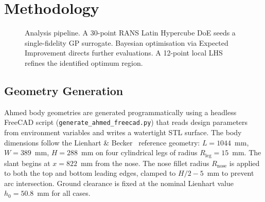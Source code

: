 \section{Methodology}
\label{sec:methodology}

\begin{figure}[h]
\centering
{}
\caption{Analysis pipeline. A 30-point RANS Latin Hypercube DoE seeds a single-fidelity GP surrogate. Bayesian optimisation via Expected Improvement directs further evaluations. A 12-point local LHS refines the identified optimum region.}
\label{fig:pipeline}
\end{figure}

\subsection{Geometry Generation}
\label{sec:geometry}

Ahmed body geometries are generated programmatically using a headless FreeCAD script (\texttt{generate\_ahmed\_freecad.py}) that reads design parameters from environment variables and writes a watertight STL surface. The body dimensions follow the Lienhart \& Becker~\cite{lienhart2002} reference geometry: $L=1044$~mm, $W=389$~mm, $H=288$~mm on four cylindrical legs of radius $R_\mathrm{leg}=15$~mm. The slant begins at $x=822$~mm from the nose. The nose fillet radius $R_\mathrm{nose}$ is applied to both the top and bottom leading edges, clamped to $H/2-5$~mm to prevent arc intersection. Ground clearance is fixed at the nominal Lienhart value $h_0=50.8$~mm for all cases.

